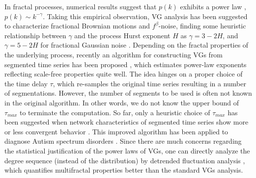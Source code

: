 		In fractal processes, numerical results suggest that $p(k)$ exhibits a power law \cite{Lacasa2008}, $p(k) \sim k^{-\gamma}$. Taking this empirical observation, VG analysis has been suggested to characterize fractional Brownian motions and $f^{\beta}$-noise, finding some heuristic relationship between $\gamma$ and the process Hurst exponent $H$ as $\gamma = 3 - 2H$, and $\gamma = 5 - 2H$ for fractional Gaussian noise \cite{Lacasa2009,Ni2009}. Depending on the fractal properties of the underlying process, recently an algorithm for constructing VGs from segmented time series has been proposed \cite{Ahmadlou2012}, which estimates power-law exponents reflecting scale-free properties quite well. The idea hinges on a proper choice of the time delay $\tau$, which re-samples the original time series resulting in a number of segmentations. However, the number of segments to be used is often not known in the original algorithm. In other words, we do not know the upper bound of $\tau_{max}$ to terminate the computation. So far, only a heuristic choice of $\tau_{max}$ has been suggested when network characteristics of segmented time series show more or less convergent behavior \cite{Ahmadlou2012}. This improved algorithm has been applied to diagnose Autism spectrum disorders \cite{Ahmadlou2012}. Since there are much concerns regarding the statistical justification of the power laws of VGs, one can directly analyze the degree sequence (instead of the distribution) by detrended fluctuation analysis \cite{Czechowski2016}, which quantifies multifractal properties better than the standard VGs analysis.  
	
